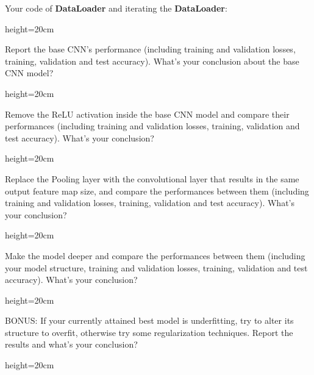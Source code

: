 \clearpage
\begin{questions}
    
    \question[2] Your code of \textbf{DataLoader} and iterating the \textbf{DataLoader}:
    
    \begin{soln}{height=20cm}
    \end{soln}
    
    \clearpage
    \question[4] Report the base CNN's performance (including training and validation losses, training, validation and test accuracy). What's your conclusion about the base CNN model?
    
    \begin{soln}{height=20cm}
    \end{soln}
    
    \clearpage
    \question[5] Remove the ReLU activation inside the base CNN model and compare their performances (including training and validation losses, training, validation and test accuracy). What's your conclusion?
    
    \begin{soln}{height=20cm}
    \end{soln}
    
    \clearpage
    \question[7] Replace the Pooling layer with the convolutional layer that results in the same output feature map size, and compare the performances between them (including training and validation losses, training, validation and test accuracy). What's your conclusion?
    
    \begin{soln}{height=20cm}
    \end{soln}
    
    \clearpage
    \question[7] Make the model deeper and compare the performances between them (including your model structure, training and validation losses, training, validation and test accuracy). What's your conclusion?
    
    \begin{soln}{height=20cm}
    \end{soln}
    
    \clearpage
    \question[10] BONUS: If your currently attained best model is underfitting, try to alter its structure to overfit, otherwise try some regularization techniques. Report the results and what's your conclusion?
    
    \begin{soln}{height=20cm}
    \end{soln}
\end{questions}